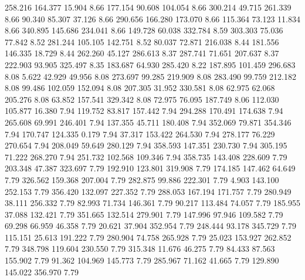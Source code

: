  258.216  164.377   15.904         8.66
 177.154   90.608  104.054         8.66
 300.214   49.715  261.339         8.66
  90.340   85.307   37.126         8.66
 290.656  166.280  173.070         8.66
 115.364   73.123   11.834         8.66
 340.895  145.686  234.041         8.66
 149.728   60.038  332.784         8.59
 303.303   75.036   77.842         8.52
 281.244  105.105  142.751         8.52
  80.037   72.871  216.038         8.44
 181.556  146.335   18.729         8.44
 262.260   45.127  286.613         8.37
 287.741   71.651  207.637         8.37
 222.903   93.905  325.497         8.35
 183.687   64.930  285.420         8.22
 187.895  101.459  296.683         8.08
   5.622   42.929   49.956         8.08
 273.697   99.285  219.909         8.08
 283.490   99.759  212.182         8.08
  99.486  102.059  152.094         8.08
 207.305   31.952  330.581         8.08
  62.975   62.068  205.276         8.08
  63.852  157.541  329.342         8.08
  72.975   76.095  187.749         8.06
 112.030  105.877   16.380         7.94
 119.752   83.817  157.442         7.94
 294.288  170.491  174.638         7.94
 265.608   69.991  246.401         7.94
 137.355   45.711  180.408         7.94
 352.069   79.871  354.346         7.94
 170.747  124.335    0.179         7.94
  37.317  153.422  264.530         7.94
 278.177   76.229  270.654         7.94
 208.049   59.649  280.129         7.94
 358.593  147.351  230.730         7.94
 305.195   71.222  268.270         7.94
 251.732  102.568  109.346         7.94
 358.735  143.408  228.609         7.79
 203.348   47.387  323.697         7.79
 192.910  123.801  319.908         7.79
 174.185  147.462   64.649         7.79
 326.562  159.368  207.004         7.79
 282.875   99.886  222.301         7.79
   4.903  143.100  252.153         7.79
 356.420  132.097  227.352         7.79
 288.053  167.194  171.757         7.79
 280.949   38.111  256.332         7.79
  82.993   71.734  146.361         7.79
  90.217  113.484   74.057         7.79
 185.955   37.088  132.421         7.79
 351.665  132.514  279.901         7.79
 147.996   97.946  109.582         7.79
  69.298   66.959   46.358         7.79
  20.621   37.904  352.954         7.79
 248.444   93.178  345.729         7.79
 115.151   25.613  191.222         7.79
 280.904   74.758  265.928         7.79
  25.023  153.927  262.852         7.79
 348.798  119.604  230.550         7.79
 315.348   11.676   46.275         7.79
  84.433   87.563  155.902         7.79
  91.362  104.969  145.773         7.79
 285.967   71.162   41.665         7.79
 129.890  145.022  356.970         7.79
